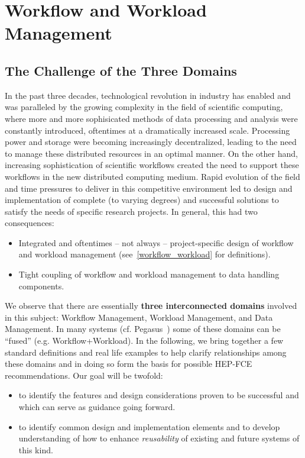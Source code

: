 \section{Workflow and Workload Management}


\subsection{The Challenge of the Three Domains}
In the past three decades, technological revolution in industry has enabled and was paralleled by the growing complexity in the field of scientific computing, where 
more and more sophisicated methods of data processing and analysis were constantly introduced, oftentimes at a dramatically increased scale.
Processing power and storage were becoming increasingly decentralized, leading to the need to manage these distributed resources in an optimal manner.
On the other hand, increasing sophistication of scientific workflows created the need to support these workflows in the new distributed computing medium.
Rapid evolution of the field and time pressures to deliver in this competitive environment led to design and implementation of complete (to varying degrees)
and successful solutions to satisfy the needs of specific  research projects. In general, this had two consequences:

\begin{itemize}
\item Integrated and oftentimes -- not always -- project-specific design of workflow and workload management (see~\ref{workflow_workload} for definitions).
\item Tight coupling of workflow and workload management to data handling components.
\end{itemize}

We observe that there are essentially \textbf{three interconnected domains} involved in this subject: Workflow Management, Workload Management,
and Data Management. In many systems (cf. Pegasus~\cite{pegasus}) some of these domains can be ``fused'' (e.g. Workflow+Workload).
In the following, we  bring together a few standard definitions and real life examples to help clarify
relationships among these domains and in doing so form the basis for possible HEP-FCE recommendations. Our goal will be twofold:
\begin{itemize}
\item to identify the features and design considerations proven to be successful and which can serve as guidance going forward.
\item to identify common design and implementation elements and to develop understanding of how to enhance \textit{reusability} of existing and future systems of this kind.
\end{itemize}

